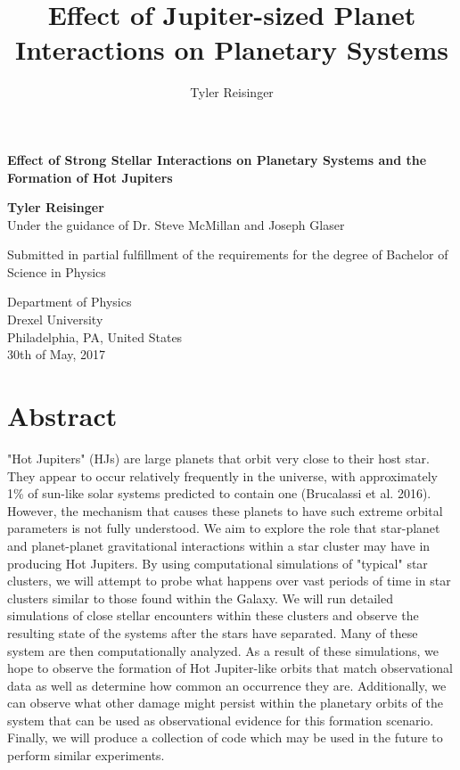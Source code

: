 \documentclass[12pt]{article}
\author{Tyler Reisinger}
\title{Effect of Jupiter-sized Planet Interactions on Planetary Systems}
\date{}
\begin{document}
\begin{titlepage}
    \begin{center}
        \vspace*{1cm}
        
        \textbf{Effect of Strong Stellar Interactions on Planetary Systems and
            the Formation of Hot Jupiters}
        
        \vspace{1.5cm}
        
        \textbf{Tyler Reisinger}\\
        Under the guidance of Dr. Steve McMillan and Joseph Glaser
        
        \vfill
        
        Submitted in partial fulfillment of the requirements for the
        degree of Bachelor of Science in Physics
        
        \vspace{0.8cm}

        Department of Physics \\
        Drexel University \\
        Philadelphia, PA, United States\\
        30th of May, 2017 
    \end{center}
\end{titlepage}

\tableofcontents

\clearpage

\section{Abstract}

"Hot Jupiters" (HJs) are large planets that orbit very close to their host star. 
They appear to occur relatively frequently in the universe, with approximately 1\% 
of sun-like solar systems predicted to contain one (Brucalassi et al. 2016). 
However, the mechanism that causes these planets to have such extreme orbital parameters
is not fully understood. 
We aim to explore the role that star-planet and planet-planet gravitational interactions 
within a star cluster may have in producing Hot 
Jupiters. By using computational simulations of "typical" star clusters,
we will attempt to probe what happens over vast periods of time
in star clusters similar to those found within the Galaxy.
We will run detailed simulations of close stellar encounters within these clusters
and observe the resulting state of the systems after the stars have separated. Many
of these system are then computationally analyzed.
As a result of these simulations, 
we hope to observe the formation of Hot Jupiter-like orbits that
match observational data as well as determine how common an occurrence they are.
Additionally, we can observe what other damage might 
persist within the planetary orbits of the system that can be used as 
observational evidence for this formation scenario. Finally, we will
produce a collection of code which may be used in the future to perform similar
experiments.
\end{document}
